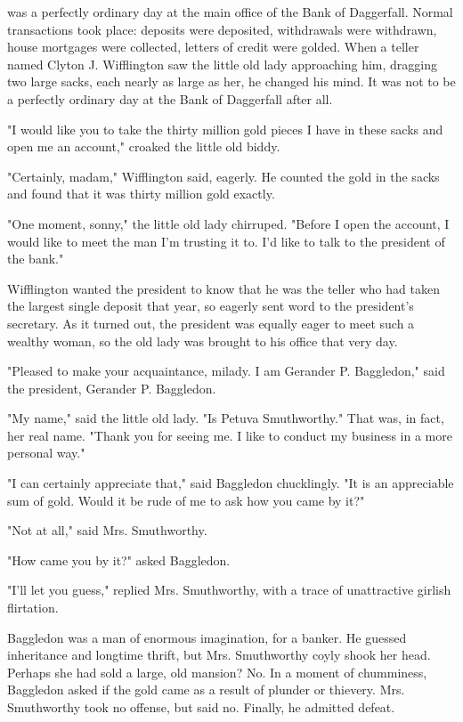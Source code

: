 
 was a perfectly ordinary day at the main office of the Bank of Daggerfall. Normal transactions took place: deposits were deposited, withdrawals were withdrawn, house mortgages were collected, letters of credit were golded. When a teller named Clyton J. Wifflington saw the little old lady approaching him, dragging two large sacks, each nearly as large as her, he changed his mind. It was not to be a perfectly ordinary day at the Bank of Daggerfall after all.

"I would like you to take the thirty million gold pieces I have in these sacks and open me an account," croaked the little old biddy.

"Certainly, madam," Wifflington said, eagerly. He counted the gold in the sacks and found that it was thirty million gold exactly.

"One moment, sonny," the little old lady chirruped. "Before I open the account, I would like to meet the man I'm trusting it to. I'd like to talk to the president of the bank."

Wifflington wanted the president to know that he was the teller who had taken the largest single deposit that year, so eagerly sent word to the president's secretary. As it turned out, the president was equally eager to meet such a wealthy woman, so the old lady was brought to his office that very day.

"Pleased to make your acquaintance, milady. I am Gerander P. Baggledon," said the president, Gerander P. Baggledon.

"My name," said the little old lady. "Is Petuva Smuthworthy." That was, in fact, her real name. "Thank you for seeing me. I like to conduct my business in a more personal way."

"I can certainly appreciate that," said Baggledon chucklingly. "It is an appreciable sum of gold. Would it be rude of me to ask how you came by it?"

"Not at all," said Mrs. Smuthworthy.

"How came you by it?" asked Baggledon.

"I'll let you guess," replied Mrs. Smuthworthy, with a trace of unattractive girlish flirtation.

Baggledon was a man of enormous imagination, for a banker. He guessed inheritance and longtime thrift, but Mrs. Smuthworthy coyly shook her head. Perhaps she had sold a large, old mansion? No. In a moment of chumminess, Baggledon asked if the gold came as a result of plunder or thievery. Mrs. Smuthworthy took no offense, but said no. Finally, he admitted defeat.

